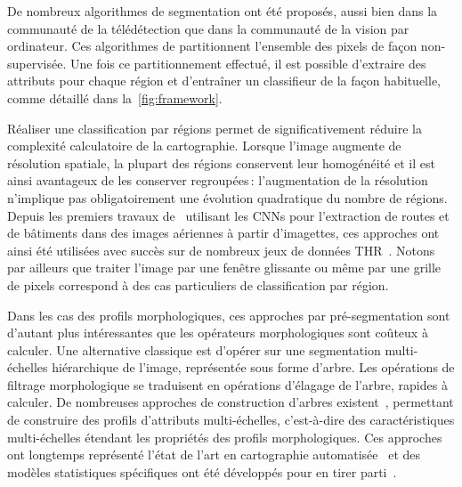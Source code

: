 De nombreux algorithmes de segmentation ont été proposés, aussi bien dans la communauté de la télédétection que dans la communauté de la vision par ordinateur. Ces algorithmes de partitionnent l'ensemble des pixels de façon non-supervisée. Une fois ce partitionnement effectué, il est possible d'extraire des attributs pour chaque région et d'entraîner un classifieur de la façon habituelle, comme détaillé dans la~\cref{fig:framework}.

Réaliser une classification par régions permet de significativement réduire la complexité calculatoire de la cartographie. Lorsque l'image augmente de résolution spatiale, la plupart des régions conservent leur homogénéité et il est ainsi avantageux de les conserver regroupées\,: l'augmentation de la résolution n'implique pas obligatoirement une évolution quadratique du nombre de régions. Depuis les premiers travaux de~\citet{mnih_machine_2013} utilisant les \glspl{CNN} pour l'extraction de routes et de bâtiments dans des images aériennes à partir d'imagettes, ces approches ont ainsi été utilisées avec succès sur de nombreux jeux de données \gls{THR}~\cite{lagrange_benchmarking_2015,vargas_superpixel-based_2014}. Notons par ailleurs que traiter l'image par une fenêtre glissante ou même par une grille de pixels correspond à des cas particuliers de classification par région.

Dans les cas des profils morphologiques, ces approches par pré-segmentation sont d'autant plus intéressantes que les opérateurs morphologiques sont coûteux à calculer. Une alternative classique est d'opérer sur une segmentation multi-échelles hiérarchique de l'image, représentée sous forme d'arbre. Les opérations de filtrage morphologique se traduisent en opérations d'élagage de l'arbre, rapides à calculer. De nombreuses approches de construction d'arbres existent~\cite{bosilj_indexation_2016}, permettant de construire des profils d'attributs multi-échelles, c'est-à-dire des caractéristiques multi-échelles étendant les propriétés des profils morphologiques. Ces approches ont longtemps représenté l'état de l'art en cartographie automatisée~\cite{pham_feature_2018} et des modèles statistiques spécifiques ont été développés pour en tirer parti~\cite{cui_combining_2016}.

